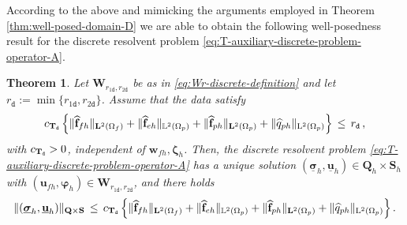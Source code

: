 \documentclass[11pt]{article}
\numberwithin{equation}{section}
\newcommand{\bsi}{{\boldsymbol\sigma}}
\newcommand{\bvarphi}{{\boldsymbol\varphi}}
\newcommand{\bzeta}{{\boldsymbol\zeta}}
\newcommand{\ubsi}{\underline{\bsi}}
\newcommand{\ubu}{\underline{\bu}}
\newcommand{\bw}{{\mathbf{w}}}
\newcommand{\f}{\mathbf{f}}
\newcommand{\bu}{\mathbf{u}}
\newcommand{\0}{{\mathbf{0}}}
\def\bW{\mathbf{W}}
\def\bT{\mathbf{T}}
\def\bQ{\mathbf{Q}}
\def\bS{\mathbf{S}}
\newcommand{\bL}{\mathbf{L}}
\newcommand\bbL{\mathbb{L}}
\def\L{\mathrm{L}}
\def\ttd{\mathtt{d}}
\def\wh{\widehat}
\newtheorem{thm}{Theorem}[section]
\numberwithin{equation}{section}
\begin{document}
According to the above and mimicking the arguments employed in Theorem 
\ref{thm:well-posed-domain-D} we are able to obtain the following well-posedness result for the discrete resolvent problem \eqref{eq:T-auxiliary-discrete-problem-operator-A}. 
%
\begin{thm}\label{thm:well-posed-discrete}
Let $\bW_{r_{1\ttd},r_{2\ttd}}$ be as in \eqref{eq:Wr-discrete-definition} and let $r_\ttd:=\min\big\{r_{1\ttd}, r_{2\ttd}\big\}$. 
Assume that the data satisfy
\begin{equation*}%
c_{\bT_{\tt d}}\,\Big\{ \|\wh{\f}_{fh}\|_{\bL^2(\Omega_f)} 
+ \|\wh{\f}_{eh}\|_{\bbL^2(\Omega_p)}
+ \|\wh{\f}_{ph}\|_{\bL^2(\Omega_p)} 
+ \|\wh{q}_{ph}\|_{\L^2(\Omega_p)} \Big\} \,\leq\, r_\ttd\,,
\end{equation*}	
with $c_{\bT_{\tt d}}>0$, independent of $\bw_{fh},\bzeta_{h}$.
Then, the discrete resolvent problem \eqref{eq:T-auxiliary-discrete-problem-operator-A} has a unique solution $(\ubsi_{h},\ubu_{h})\in \bQ_{h}\times \bS_{h}$ with $(\bu_{fh},\bvarphi_{h})\in \bW_{r_{1\ttd},r_{2\ttd}}$, and there holds
%
\begin{equation*}%
\|(\ubsi_{h},\ubu_{h})\|_{\bQ\times \bS} 
\,\leq\, c_{\bT_{\tt d}}\,\Big\{ \|\wh{\f}_{fh}\|_{\bL^2(\Omega_f)} 
+  \|\wh{\f}_{eh}\|_{\bbL^2(\Omega_p)}
+ \|\wh{\f}_{ph}\|_{\bL^2(\Omega_p)} 
+ \|\wh{q}_{ph}\|_{\L^2(\Omega_p)}\Big\}\,.
\end{equation*} 
\end{thm}
\end{document}
